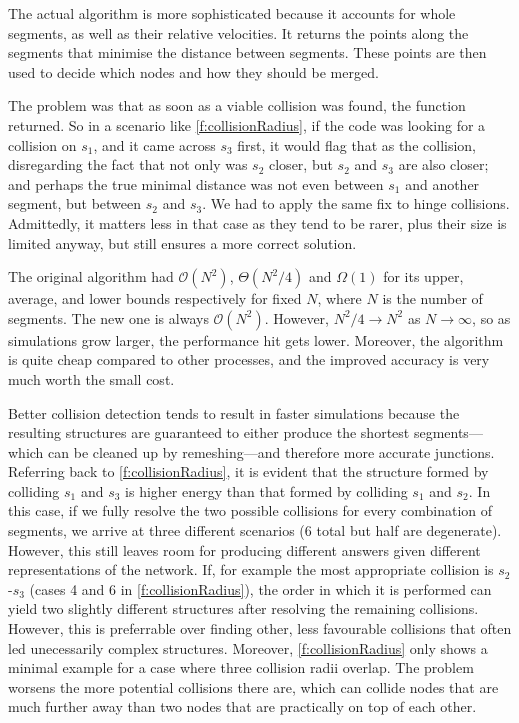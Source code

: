 The actual algorithm is more sophisticated because it accounts for whole segments, as well as their relative velocities. It returns the points along the segments that minimise the distance between segments. These points are then used to decide which nodes and how they should be merged.

The problem was that as soon as a viable collision was found, the function returned. So in a scenario like \cref{f:collisionRadius}, if the code was looking for a collision on $s_1$, and it came across $s_3$ first, it would flag that as the collision, disregarding the fact that not only was $s_2$ closer, but $s_2$ and $s_3$ are also closer; and perhaps the true minimal distance was not even between $s_1$ and another segment, but between $s_2$ and $s_3$. We had to apply the same fix to hinge collisions. Admittedly, it matters less in that case as they tend to be rarer, plus their size is limited anyway, but still ensures a more correct solution.

The original algorithm had $\mathcal{O}(N^2)$, $\mathcal{\Theta}(N^2/4)$ and $\mathcal{\Omega}(1)$ for its upper, average, and lower bounds respectively for fixed $N$, where $N$ is the number of segments. The new one is always $\mathcal{O}(N^2)$. However, $N^2/4 \to N^2$ as $N\to\infty$, so as simulations grow larger, the performance hit gets lower. Moreover, the algorithm is quite cheap compared to other processes, and the improved accuracy is very much worth the small cost.

Better collision detection tends to result in faster simulations because the resulting structures are guaranteed to either produce the shortest segments---which can be cleaned up by remeshing---and therefore more accurate junctions. Referring back to \cref{f:collisionRadius}, it is evident that the structure formed by colliding $s_1$ and $s_3$ is higher energy than that formed by colliding $s_1$ and $s_2$. In this case, if we fully resolve the two possible collisions for every combination of segments, we arrive at three different scenarios (6 total but half are degenerate). However, this still leaves room for producing different answers given different representations of the network. If, for example the most appropriate collision is $s_2$-$s_3$ (cases 4 and 6 in \cref{f:collisionRadius}), the order in which it is performed can yield two slightly different structures after resolving the remaining collisions. However, this is preferrable over finding other, less favourable collisions that often led unecessarily complex structures. Moreover, \cref{f:collisionRadius} only shows a minimal example for a case where three collision radii overlap. The problem worsens the more potential collisions there are, which can collide nodes that are much further away than two nodes that are practically on top of each other.

